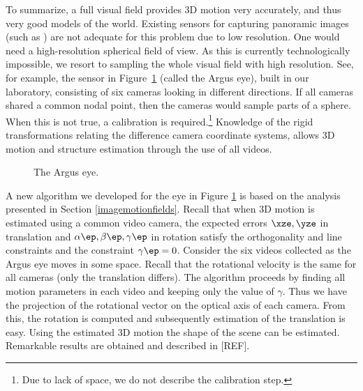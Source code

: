 \documentclass[10pt,twocolumn]{article}
\begin{document}
To summarize, a full visual field provides 3D motion very accurately,
and thus very good models of the world. Existing sensors for capturing
panoramic images (such as \cite{nayar97}) are not adequate for this problem
due to low resolution. One would need a high-resolution spherical
field of view. As this is currently technologically impossible, we
resort to sampling the whole visual field with high resolution. See,
for example, the sensor in Figure~\ref{fig:2ndargus} (called the Argus
eye), built in our laboratory,
consisting of six cameras looking in different directions. If all
cameras shared a common nodal point, then the cameras would sample
parts of a sphere. When this is not true, a calibration is
required.\footnote{Due to lack of space, we do not describe the
calibration step.} Knowledge of the rigid transformations relating the
difference camera coordinate systems, allows 3D motion and structure
estimation through the use of all videos. 

\begin{figure}[htbp]
  \caption{The Argus eye.}
  \label{fig:2ndargus}
\end{figure}

A new algorithm we developed for the eye in Figure \ref{fig:2ndargus}
is based on the analysis presented in Section
\ref{imagemotionfields}. Recall that when 3D motion is estimated using
a common video camera, the expected errors $\xze, \yze$ in translation
and $\alpha\ep, \beta\ep,
\gamma\ep$ in rotation satisfy the orthogonality and line constraints
and the constraint $\gamma\ep = 0$. Consider the six videos collected
as the Argus eye moves in some space. Recall that the rotational
velocity is the same for all cameras (only the translation
differs). The algorithm proceeds by finding all motion parameters in
each video and keeping only the value of $\gamma$. Thus we have the
projection of the rotational vector on the optical axis of each
camera. From this, the rotation is computed and subsequently
estimation of the translation is easy. Using the estimated 3D motion
the shape of the scene can be estimated. Remarkable results are
obtained and described in [REF].




\end{document}
